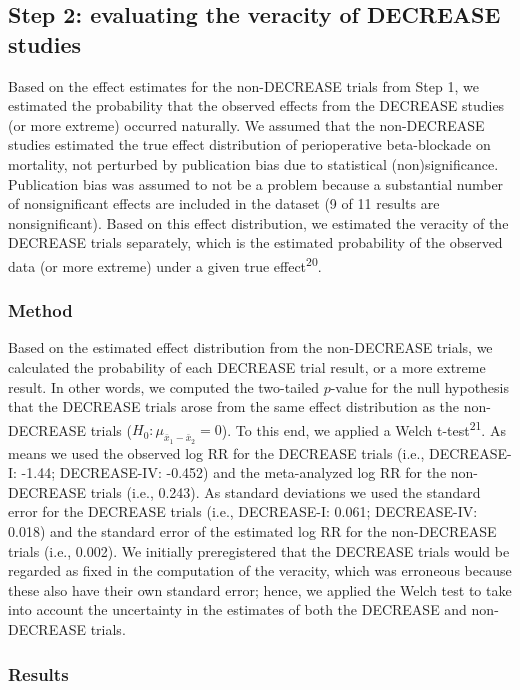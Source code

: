 \documentclass[]{article}
\begin{document}
\subsection{Step 2: evaluating the veracity of DECREASE
studies}\label{step-2-evaluating-the-veracity-of-decrease-studies}

Based on the effect estimates for the non-DECREASE trials from Step 1,
we estimated the probability that the observed effects from the DECREASE
studies (or more extreme) occurred naturally. We assumed that the
non-DECREASE studies estimated the true effect distribution of
perioperative beta-blockade on mortality, not perturbed by publication
bias due to statistical (non)significance. Publication bias was assumed
to not be a problem because a substantial number of nonsignificant
effects are included in the dataset (9 of 11 results are
nonsignificant). Based on this effect distribution, we estimated the
veracity of the DECREASE trials separately, which is the estimated
probability of the observed data (or more extreme) under a given true
effect\textsuperscript{20}.

\subsubsection{Method}\label{method}

Based on the estimated effect distribution from the non-DECREASE trials,
we calculated the probability of each DECREASE trial result, or a more
extreme result. In other words, we computed the two-tailed \(p\)-value
for the null hypothesis that the DECREASE trials arose from the same
effect distribution as the non-DECREASE trials
(\(H_0:\mu_{\bar{x}_1-\bar{x}_2}=0\)). To this end, we applied a Welch
t-test\textsuperscript{21}. As means we used the observed log RR for the
DECREASE trials (i.e., DECREASE-I: -1.44; DECREASE-IV: -0.452) and the
meta-analyzed log RR for the non-DECREASE trials (i.e., 0.243). As
standard deviations we used the standard error for the DECREASE trials
(i.e., DECREASE-I: 0.061; DECREASE-IV: 0.018) and the standard error of
the estimated log RR for the non-DECREASE trials (i.e., 0.002). We
initially preregistered that the DECREASE trials would be regarded as
fixed in the computation of the veracity, which was erroneous because
these also have their own standard error; hence, we applied the Welch
test to take into account the uncertainty in the estimates of both the
DECREASE and non-DECREASE trials.

\subsubsection{Results}\label{results-1}
\end{document}
